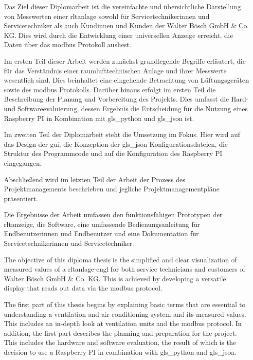 \noindent Das Ziel dieser Diplomarbeit ist die vereinfachte und übersichtliche Darstellung von Messwerten einer \acf{rltanlage} sowohl für Servicetechnikerinnen und Servicetechniker als auch Kundinnen und Kunden der Walter Bösch GmbH \& Co. KG. Dies wird durch die Entwicklung einer universellen Anzeige erreicht, die Daten über das \gls{modbus} Protokoll ausliest. 

Im ersten Teil dieser Arbeit werden zunächst grundlegende Begriffe erläutert, die für das Verständnis einer raumlufttechnischen Anlage und ihrer Messwerte wesentlich sind. Dies beinhaltet eine eingehende Betrachtung von Lüftungsgeräten sowie des \gls{modbus} Protokolls. Darüber hinaus erfolgt im ersten Teil die Beschreibung der Planung und Vorbereitung des Projekts. Dies umfasst die Hard- und Softwareevaluierung, dessen Ergebnis die Entscheidung für die Nutzung eines Raspberry PI in Kombination mit \gls{gls_python} und \gls{gls_json} ist. 

Im zweiten Teil der Diplomarbeit steht die Umsetzung im Fokus. Hier wird auf das Design der \acf{gui}, die Konzeption der \gls{gls_json} Konfigurationsdateien, die Struktur des Programmcode und auf die Konfiguration des Raspberry PI eingegangen. 

Abschließend wird im letzten Teil der Arbeit der Prozess des Projektmanagements beschrieben und jegliche Projektmanagementpläne präsentiert.

Die Ergebnisse der Arbeit umfassen den funktionsfähigen Prototypen der \ac{rltanzeige}, die Software, eine umfassende Bedienungsanleitung für Endbenutzerinnen und Endbenutzer und eine Dokumentation für Servicetechnikerinnen und Servicetechniker.


\noindent The objective of this diploma thesis is the simplified and clear visualization of measured values of a \acf{rltanlage-engl} for both service technicians and customers of Walter Bösch GmbH \& Co. KG. This is achieved by developing a versatile display that reads out data via the \gls{modbus} protocol. 

The first part of this thesis begins by explaining basic terms that are essential to understanding a ventilation and air conditioning system and its measured values. This includes an in-depth look at ventilation units and the \gls{modbus} protocol. In addition, the first part describes the planning and preparation for the project. This includes the hardware and software evaluation, the result of which is the decision to use a Raspberry PI in combination with \gls{gls_python} and \gls{gls_json}. 

